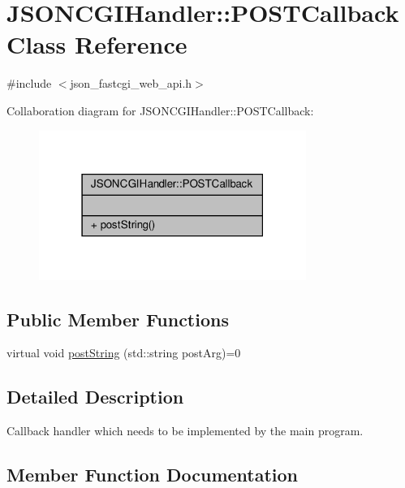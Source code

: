 \hypertarget{classJSONCGIHandler_1_1POSTCallback}{}\section{J\+S\+O\+N\+C\+G\+I\+Handler\+:\+:P\+O\+S\+T\+Callback Class Reference}
\label{classJSONCGIHandler_1_1POSTCallback}


{\ttfamily \#include $<$json\+\_\+fastcgi\+\_\+web\+\_\+api.\+h$>$}



Collaboration diagram for J\+S\+O\+N\+C\+G\+I\+Handler\+:\+:P\+O\+S\+T\+Callback\+:
\nopagebreak
\begin{figure}[H]
\begin{center}
\leavevmode
\includegraphics[width=247pt]{classJSONCGIHandler_1_1POSTCallback__coll__graph}
\end{center}
\end{figure}
\subsection*{Public Member Functions}
\begin{DoxyCompactItemize}
\item 
virtual void \hyperlink{classJSONCGIHandler_1_1POSTCallback_a6cddb384a3fd9242b323cea3d82a6bb7}{post\+String} (std\+::string post\+Arg)=0
\end{DoxyCompactItemize}


\subsection{Detailed Description}
Callback handler which needs to be implemented by the main program. 

\subsection{Member Function Documentation}
\mbox{\label{classJSONCGIHandler_1_1POSTCallback_a6cddb384a3fd9242b323cea3d82a6bb7}} 

